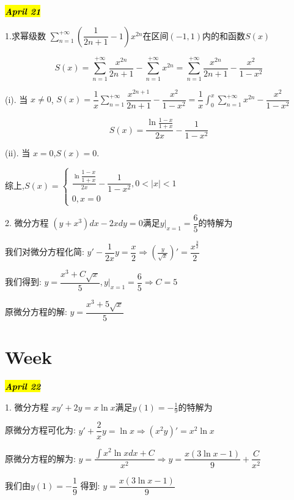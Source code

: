 \hl{\textbf{\textit{April 21}}}

1.求幂级数 $\sum\limits_{n=1}^{+\infty}(\dfrac{1}{2n+1}-1)x^{2n}\text{在区间}(-1,1)\text{内的和函数} S(x)$
\begin{solution}
	
	$$S(x)=\sum\limits_{n=1}^{+\infty}\frac{x^{2n}}{2n+1}-\sum\limits_{n=1}^{+\infty}x^{2n}=\sum\limits_{n=1}^{+\infty}\frac{x^{2n}}{2n+1}-\frac{x^2}{1-x^2}$$
	
	(i). 当 $x\neq 0$, $S(x)=\dfrac{1}{x}\sum\limits_{n=1}^{+\infty}\dfrac{x^{2n+1}}{2n+1}-\dfrac{x^2}{1-x^2}=\dfrac{1}{x}\int_{0}^{x}\sum\limits_{n=1}^{+\infty}x^{2n}-\dfrac{x^2}{1-x^2}$
	
	$$S(x)=\frac{\ln\frac{1-x}{1+x}}{2x}-\frac{1}{1-x^2}$$
	
	(ii). 当 $x=0$,$S(x)=0$.
	
	综上,$S(x)=\left\lbrace 
	\begin{array}{l}
		\frac{\ln\dfrac{1-x}{1+x}}{2x}-\dfrac{1}{1-x^2},0<|x|<1\\
		0,x=0
	\end{array}
	\right.$
\end{solution}

2. 微分方程 $(y+x^3)dx-2xdy=0\text{满足}y|_{x=1}=\dfrac{6}{5}\text{的特解为}$
\begin{solution}
	
	我们对微分方程化简: $y'-\dfrac{1}{2x}y=\dfrac{x}{2}\Rightarrow (\frac{y}{\sqrt{x}})'=\dfrac{x^{\frac{3}{2}}}{2}$
	
	我们得到: $y=\dfrac{x^3+C\sqrt{x}}{5},y|_{x=1}=\dfrac{6}{5}\Rightarrow C=5$
	
	原微分方程的解: $y=\dfrac{x^3+5\sqrt{x}}{5}$
\end{solution}

\section{Week }
\hl{\textbf{\textit{April 22}}}

1. 微分方程 $xy'+2y=x\ln x\text{满足}y(1)=-\frac{1}{9}\text{的特解为}$
\begin{solution}
	
	原微分方程可化为: $y'+\dfrac{2}{x}y=\ln x\Rightarrow (x^2y)'=x^2\ln x$
	
	原微分方程的解为: $y=\dfrac{\int x^2\ln xdx+C}{x^2}\Rightarrow y=\dfrac{x(3\ln x-1)}{9}+\dfrac{C}{x^2}$
	
	我们由$y(1)=-\dfrac{1}{9}$ 得到: $y=\dfrac{x(3\ln x-1)}{9}$
\end{solution}

